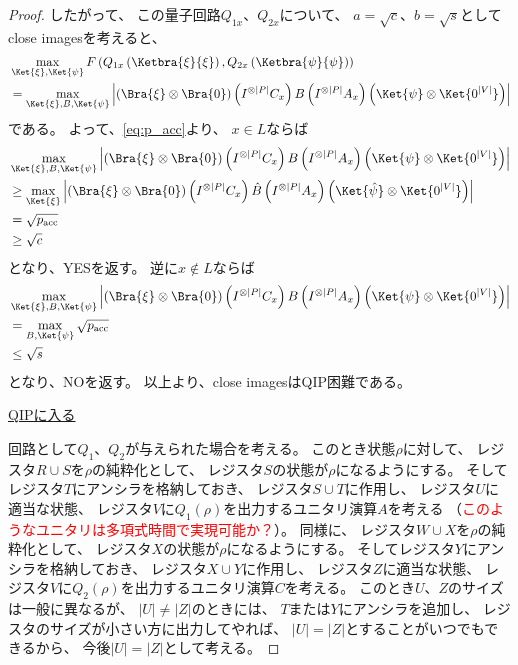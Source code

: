 \documentclass[a4paper, 10pt]{jsarticle}
\begin{document}
\begin{proof}
	したがって、
	この量子回路$Q_{1x}$、$Q_{2x}$について、
	$a = \sqrt{c}$、$b = \sqrt{s}$としてclose imagesを考えると、
	\begin{align}
		&\max_{\Ket{\xi}, \Ket{\psi}}
		F\left( Q_{1x} \left( \Ketbra{\xi}{\xi} \right),
		Q_{2x} \left( \Ketbra{\psi}{\psi} \right) \right) \\
		&= \max_{\Ket{\xi}, B, \Ket{\psi}} \left|
			\left( \Bra{\xi} \otimes \Bra{0} \right)
			\left( I^{\otimes |P|} C_x \right)
			B
			\left( I^{\otimes |P|} A_x \right)
			\left( \Ket{\psi} \otimes \Ket{0^{|V|}} \right)
		\right|
	\end{align}
	である。
	よって、\eqref{eq:p_acc}より、
	$x \in L$ならば
	\begin{align}
		&\max_{\Ket{\xi}, B, \Ket{\psi}} \left|
			\left( \Bra{\xi} \otimes \Bra{0} \right)
			\left( I^{\otimes |P|} C_x \right)
			B
			\left( I^{\otimes |P|} A_x \right)
			\left( \Ket{\psi} \otimes \Ket{0^{|V|}} \right)
		\right| \\
		&\geq \max_{\Ket{\xi}} \left|
			\left( \Bra{\xi} \otimes \Bra{0} \right)
			\left( I^{\otimes |P|} C_x \right)
			\hat{B}
			\left( I^{\otimes |P|} A_x \right)
			\left( \Ket{\hat{\psi}} \otimes \Ket{0^{|V|}} \right)
		\right| \\
		&= \sqrt{p_{\mathrm{acc}}} \\
		&\geq \sqrt{c}
	\end{align}
	となり、YESを返す。
	逆に$x \notin L$ならば
	\begin{align}
		&\max_{\Ket{\xi}, B, \Ket{\psi}} \left|
			\left( \Bra{\xi} \otimes \Bra{0} \right)
			\left( I^{\otimes |P|} C_x \right)
			B
			\left( I^{\otimes |P|} A_x \right)
			\left( \Ket{\psi} \otimes \Ket{0^{|V|}} \right)
		\right| \\
		&= \max_{B, \Ket{\psi}} \sqrt{p_{\mathrm{acc}}} \\
		&\leq \sqrt{s}
	\end{align}
	となり、NOを返す。
	以上より、close imagesはQIP困難である。

	\noindent \underline{QIPに入る}

	回路として$Q_1$、$Q_2$が与えられた場合を考える。
	このとき状態$\rho$に対して、
	レジスタ$R \cup S$を$\rho$の純粋化として、
	レジスタ$S$の状態が$\rho$になるようにする。
	そしてレジスタ$T$にアンシラを格納しておき、
	レジスタ$S \cup T$に作用し、
	レジスタ$U$に適当な状態、
	レジスタ$V$に$Q_1(\rho)$を出力するユニタリ演算$A$を考える
	（\textcolor{red}{このようなユニタリは多項式時間で実現可能か？}）。
	同様に、
	レジスタ$W \cup X$を$\rho$の純粋化として、
	レジスタ$X$の状態が$\rho$になるようにする。
	そしてレジスタ$Y$にアンシラを格納しておき、
	レジスタ$X \cup Y$に作用し、
	レジスタ$Z$に適当な状態、
	レジスタ$V$に$Q_2(\rho)$を出力するユニタリ演算$C$を考える。
	このとき$U$、$Z$のサイズは一般に異なるが、
	$|U| \neq |Z|$のときには、
	$T$または$Y$にアンシラを追加し、
	レジスタのサイズが小さい方に出力してやれば、
	$|U| = |Z|$とすることがいつでもできるから、
	今後$|U| = |Z|$として考える。


\end{proof}
\end{document}
